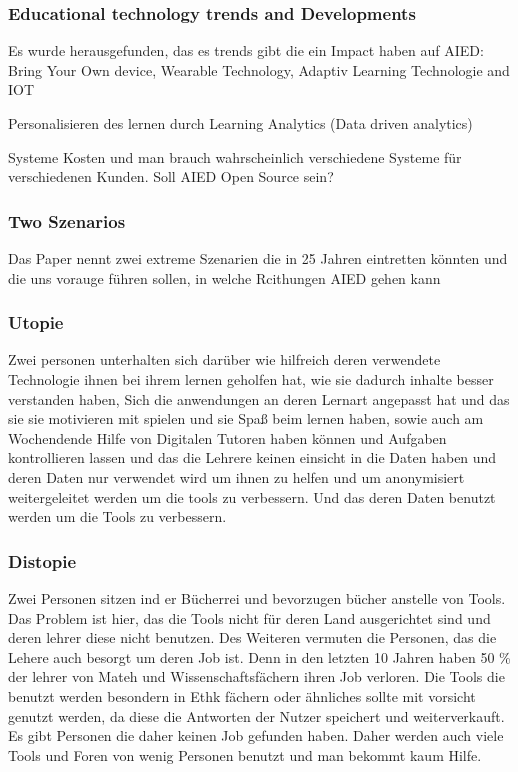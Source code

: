 \subsubsection{Educational technology trends and Developments}
Es wurde herausgefunden, das es trends gibt die ein Impact haben auf AIED: Bring Your Own device, Wearable Technology, Adaptiv Learning Technologie and IOT

Personalisieren des lernen durch Learning Analytics (Data driven analytics)

Systeme Kosten und man brauch wahrscheinlich verschiedene Systeme für verschiedenen Kunden. Soll AIED Open Source sein?




\subsubsection{Two Szenarios}
Das Paper nennt zwei extreme Szenarien die in 25 Jahren eintretten könnten und die uns vorauge führen sollen, in welche Rcithungen AIED gehen kann

\subsubsection{Utopie}
Zwei personen unterhalten sich darüber wie hilfreich deren verwendete Technologie ihnen bei ihrem
lernen geholfen hat, wie sie dadurch inhalte besser verstanden haben, Sich die anwendungen an deren Lernart angepasst hat und das sie sie motivieren mit spielen und sie Spaß beim lernen haben, sowie auch am Wochendende Hilfe von Digitalen Tutoren haben können und Aufgaben kontrollieren lassen
und das die Lehrere keinen einsicht in die Daten haben und deren Daten nur verwendet wird um ihnen zu helfen und um anonymisiert weitergeleitet werden um die tools zu verbessern. Und das deren Daten benutzt werden um die Tools zu verbessern.


\subsubsection{Distopie}
Zwei Personen sitzen ind er Bücherrei und bevorzugen bücher anstelle von Tools. Das Problem ist hier, das die Tools nicht für deren Land ausgerichtet sind und deren lehrer diese nicht benutzen. 
Des Weiteren vermuten die Personen, das die Lehere auch besorgt um deren Job ist. Denn in den letzten 10 Jahren haben 50 \% der lehrer von Mateh und Wissenschaftsfächern ihren Job verloren.
Die Tools die benutzt werden besondern in Ethk fächern oder ähnliches sollte mit vorsicht genutzt werden, da diese die Antworten der Nutzer speichert und weiterverkauft. Es gibt Personen die daher keinen Job gefunden haben.
Daher werden auch viele Tools und Foren von wenig Personen benutzt und man bekommt kaum Hilfe.

